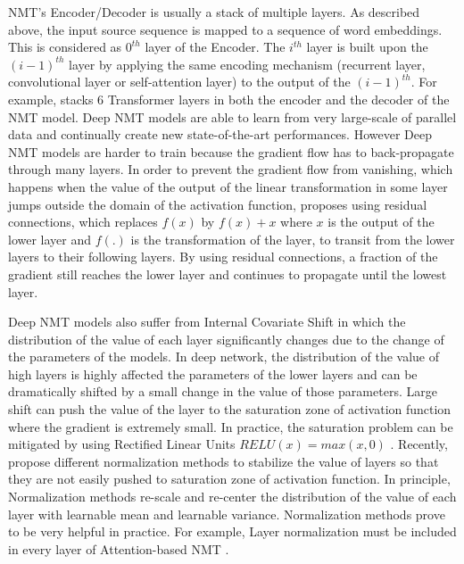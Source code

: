 NMT's Encoder/Decoder is usually a stack of multiple layers. As described above, the input source sequence is mapped to a sequence of word embeddings. This is considered as $0^{th}$ layer of the Encoder. The $i^{th}$ layer is built upon the $(i-1)^{th}$ layer by applying the same encoding mechanism (recurrent layer, convolutional layer or self-attention layer) to the output of the $(i-1)^{th}$. For example, \cite{Vaswani17attention} stacks 6 Transformer layers in both the encoder and the decoder of the NMT model. Deep NMT models are able to learn from very large-scale of parallel data \cite{Ott18scaling} and continually create new state-of-the-art performances. However Deep NMT models are harder to train because the gradient flow has to back-propagate through many layers. In order to prevent the gradient flow from vanishing, which happens when the value of the output of the linear transformation in some layer jumps outside the domain of the activation function, \citep{He16deep} proposes using residual connections, which replaces $f(x)$ by $f(x)+x$ where $x$ is the output of the lower layer and $f(.)$ is the transformation of the layer, to transit from the lower layers to their following layers. By using residual connections, a fraction of the gradient still reaches the lower layer and continues to propagate until the lowest layer.

Deep NMT models also suffer from Internal Covariate Shift in which the distribution of the value of each layer significantly changes due to the change of the parameters of the models. In deep network, the distribution of the value of high layers is highly affected the parameters of the lower layers and can be dramatically shifted by a small change in the value of those parameters. Large shift can push the value of the layer to the saturation zone of activation function where the gradient is extremely small. In practice, the saturation problem can be mitigated by using Rectified Linear Units $RELU(x) = max(x,0)$ \cite{Nair10rectified}. Recently, \cite{Ioffe15batch,Jimmy16layer} propose different normalization methods to stabilize the value of layers so that they are not easily pushed to saturation zone of activation function. In principle, Normalization methods re-scale and re-center the distribution of the value of each layer with learnable mean and learnable variance. Normalization methods prove to be very helpful in practice. For example, Layer normalization must be included in every layer of Attention-based NMT \cite{Vaswani17attention}.

